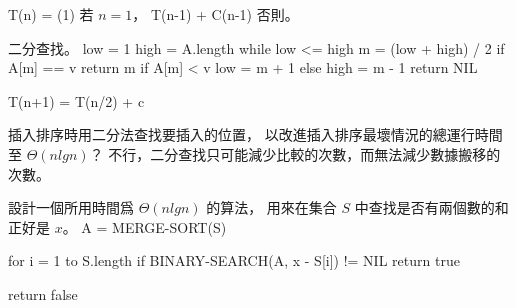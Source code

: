 \startformula
T(n) = \startmathcases
\NC \Theta(1)		\NC 若 $n = 1$， \NR
\NC T(n-1) + C(n-1)	\NC 否則。 \NR
\stopmathcases
\stopformula
\stopANSWER

二分查找。
\stopEXERCISE
\startANSWER
{}
\startCLRS
low = 1
high = A.length
while low <= high
	m = (low + high) / 2
	if A[m] == v
		return m
	if A[m] < v
		low = m + 1
	else
		high = m - 1
return NIL
\stopCLRS

\startformula
T(n+1) = T(n/2) + c
\stopformula
\stopANSWER

\startEXERCISE
插入排序時用二分法查找要插入的位置，
以改進插入排序最壞情況的總運行時間至 $\Theta(nlgn)$？
\stopEXERCISE
\startANSWER
不行，二分查找只可能減少比較的次數，而無法減少數據搬移的次數。
\stopANSWER

\startEXERCISE
設計一個所用時間爲 $\Theta(nlgn)$ 的算法，
用來在集合 $S$ 中查找是否有兩個數的和正好是 $x$。
\stopEXERCISE
\startANSWER
{}
\startCLRS
A = MERGE-SORT(S)

for i = 1 to S.length
	if BINARY-SEARCH(A, x - S[i]) != NIL
		return true

return false
\stopCLRS
\stopANSWER

\stopsection
